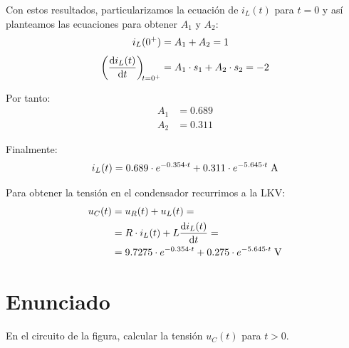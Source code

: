 \vspace{2mm}
Con estos resultados, particularizamos la ecuación de $i_L(t)$ para
$t = 0$ y así planteamos las ecuaciones para obtener $A_1$ y $A_2$:
\begin{align*}
  i_L(0^+) &= A_1 + A_2 = 1\\[3pt]
  \diff{i_L(t)}{t}[t = 0^+] &= A_1 \cdot s_1 + A_2 \cdot s_2 = -2
\end{align*}

Por tanto:
\begin{align*}
  A_1 &= 0.689\\
  A_2 &= 0.311
\end{align*}

Finalmente:
\begin{equation*}
  i_L(t) = 0.689 \cdot e^{-0.354 \cdot t} + 0.311 \cdot e^{-5.645 \cdot t}\;\si{\ampere}\\
\end{equation*}

\vspace{3mm}
Para obtener la tensión en el condensador recurrimos a la LKV:
\begin{align*}
  u_C(t) &= u_R(t) + u_L(t) = \\
         &= R \cdot i_L(t) + L \diff{i_L(t)}{t} = \\
         &= 9.7275 \cdot e^{-0.354 \cdot t} + 0.275 \cdot e^{-5.645 \cdot t} \;\si{\volt}
\end{align*}

\section{Enunciado}
En el circuito de la figura, calcular la tensión $u_C(t)$ para $t > 0$.

